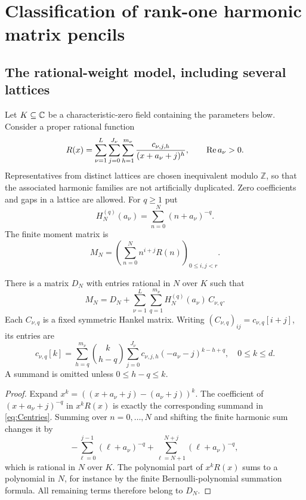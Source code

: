 \section{Classification of rank-one harmonic matrix pencils}
\label{sec:classification}

\subsection{The rational-weight model, including several lattices}
Let $K\subseteq\mathbb C$ be a characteristic-zero field containing the
parameters below. Consider a proper rational function
\begin{equation}\label{eq:rational-weight}
 R(x)=\sum_{\nu=1}^{L}\sum_{j=0}^{J_\nu}
             \sum_{h=1}^{m_\nu}\frac{c_{\nu,j,h}}{(x+a_\nu+j)^h},
 \qquad \operatorname{Re} a_\nu>0.
\end{equation}
Representatives from distinct lattices are chosen inequivalent modulo
$\mathbb Z$, so that the associated harmonic families are not artificially
duplicated. Zero coefficients and gaps in a lattice are allowed.
For $q\ge1$ put
\begin{equation}\label{eq:shifted-harmonic}
 H_N^{(q)}(a_\nu)=\sum_{n=0}^N(n+a_\nu)^{-q}.
\end{equation}
The finite moment matrix is
\begin{equation}\label{eq:rational-moment-matrix}
 M_N=\left(\sum_{n=0}^Nn^{i+j}R(n)\right)_{0\le i,j<r}.
\end{equation}

\begin{proposition}\label{prop:pencil}
There is a matrix $D_N$ with entries rational in $N$ over $K$ such that
\begin{equation}\label{eq:pencil-decomposition}
 M_N=D_N+\sum_{\nu=1}^L\sum_{q=1}^{m_\nu}
                H_N^{(q)}(a_\nu)\,C_{\nu,q}.
\end{equation}
Each $C_{\nu,q}$ is a fixed symmetric Hankel matrix. Writing
$(C_{\nu,q})_{ij}=c_{\nu,q}[i+j]$, its entries are
\begin{equation}\label{eq:Centries}
 c_{\nu,q}[k]=\sum_{h=q}^{m_\nu}\binom{k}{h-q}
       \sum_{j=0}^{J_\nu}c_{\nu,j,h}(-a_\nu-j)^{k-h+q},
       \quad 0\le k\le d.
\end{equation}
A summand is omitted unless $0\le h-q\le k$.
\end{proposition}
\begin{proof}
Expand $x^k=((x+a_\nu+j)-(a_\nu+j))^k$. The coefficient of
$(x+a_\nu+j)^{-q}$ in $x^kR(x)$ is exactly the corresponding summand
in \eqref{eq:Centries}. Summing over $n=0,\ldots,N$ and shifting the
finite harmonic sum changes it by
\[
 -\sum_{\ell=0}^{j-1}(\ell+a_\nu)^{-q}
 +\sum_{\ell=N+1}^{N+j}(\ell+a_\nu)^{-q},
\]
which is rational in $N$ over $K$. The polynomial part of $x^kR(x)$
sums to a polynomial in $N$, for instance by the finite Bernoulli-polynomial
summation formula. All remaining terms therefore belong to $D_N$.
\end{proof}

